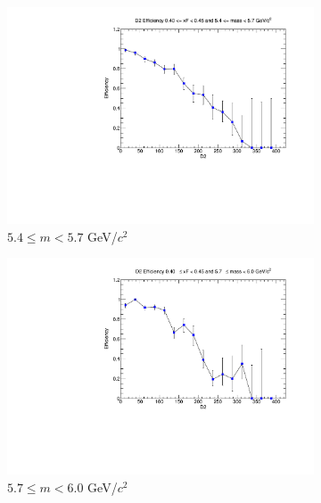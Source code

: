 \begin{figure}[p]
\begin{subfigure}[b]{0.32\textwidth}
        \includegraphics[width=\textwidth]{./kTrackerEfficiencyPlots/D2_Efficiency_xF8_mass4.pdf}
        \caption{$5.4 \leq m < 5.7$ GeV/$c^2$}
        \label{fig:xF8_mass4}
    \end{subfigure}
    \hfill
    \begin{subfigure}[b]{0.32\textwidth}
        \centering
        \includegraphics[width=\textwidth]{./kTrackerEfficiencyPlots/D2_Efficiency_xF8_mass5.pdf}
        \caption{$5.7 \leq m < 6.0$ GeV/$c^2$}
        \label{fig:xF8_mass5}
    \end{subfigure}
    \vspace{0.5cm}
    \begin{subfigure}[b]{0.32\textwidth}
        \centering

\end{subfigure}
\end{figure}
